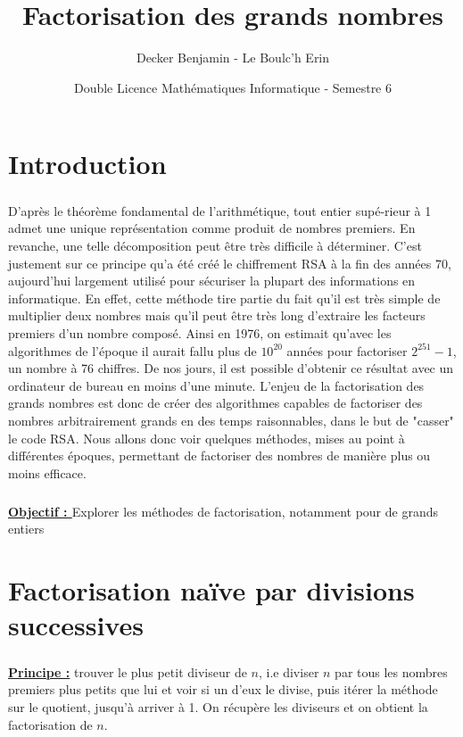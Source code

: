 \documentclass[11pt,a4paper]{article}
\begin{document}
	
	\title{Factorisation des grands nombres} 
	\author{Decker Benjamin - Le Boulc'h Erin}
	\date{Double Licence Mathématiques Informatique - Semestre 6}
	\maketitle
	\newpage
	
	\renewcommand*\contentsname{Sommaire}
	\tableofcontents
	
	\section{\LARGE{Introduction}}
	\subparagraph{}
	D'après le théorème fondamental de l'arithmétique, tout entier supé-rieur à 1 admet une unique représentation comme produit de nombres premiers. En revanche, une telle décomposition peut être très difficile à déterminer. C'est justement sur ce principe qu'a été créé le chiffrement RSA à la fin des années 70, aujourd'hui largement utilisé pour sécuriser la plupart des informations en informatique. En effet, cette méthode tire partie du fait qu'il est très simple de multiplier deux nombres mais qu'il peut être très long d'extraire les facteurs premiers d'un nombre composé. Ainsi en 1976, on estimait qu'avec les algorithmes de l'époque il aurait fallu plus de $10^{20}$ années pour factoriser $2^{251} - 1$, un nombre à 76 chiffres. De nos jours, il est possible d'obtenir ce résultat avec un ordinateur de bureau en moins d'une minute. L'enjeu de la factorisation des grands nombres est donc de créer des algorithmes capables de factoriser des nombres arbitrairement grands en des temps raisonnables, dans le but de "casser" le code RSA. Nous allons donc voir quelques méthodes, mises au point à différentes époques, permettant de factoriser des nombres de manière plus ou moins efficace.
	\subparagraph{}
	\textbf{\underline{Objectif : }}Explorer les méthodes de factorisation, notamment pour de grands entiers
	
	\section{\LARGE{Factorisation naïve par divisions successives}}
	\subparagraph{}
	\textbf{\underline{Principe :}} trouver le plus petit diviseur de  $\mathit{n}$, i.e diviser  $\mathit{n}$ par tous les nombres premiers plus petits que lui et voir si un d’eux le divise, puis itérer la méthode sur le quotient, jusqu'à arriver à 1. On récupère les diviseurs et on obtient la factorisation de $\mathit{n}$.
	
\end{document}
